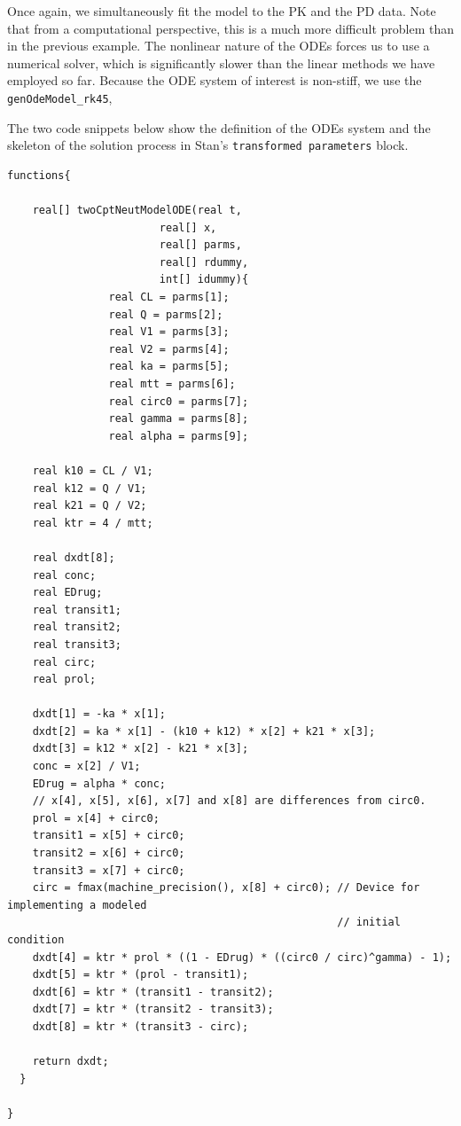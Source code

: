 \documentclass[10pt, reqno, oneside]{amsbook}
\numberwithin{equation}{chapter}
\numberwithin{figure}{chapter}
\numberwithin{table}{chapter}
\theoremstyle{remark}
\begin{document}
Once again, we simultaneously fit the model to the PK and the PD
data. Note that from a computational perspective, this is a much more
difficult problem than in the previous
example. The nonlinear nature of the ODEs forces us to use a numerical
solver, which is significantly slower than the linear methods we have
employed so far. Because the ODE system of interest is non-stiff, we
use the \texttt{genOdeModel\_rk45}, 

The two code snippets below show the definition of the ODEs
system and the skeleton of the solution process in Stan's
\texttt{transformed parameters} block.
\begin{verbatim}
functions{

    real[] twoCptNeutModelODE(real t,
                        real[] x,
                        real[] parms,
                        real[] rdummy,
                        int[] idummy){
                real CL = parms[1];
                real Q = parms[2];
                real V1 = parms[3];
                real V2 = parms[4];
                real ka = parms[5];
                real mtt = parms[6];
                real circ0 = parms[7];
                real gamma = parms[8];
                real alpha = parms[9];

    real k10 = CL / V1;
    real k12 = Q / V1;
    real k21 = Q / V2;
    real ktr = 4 / mtt;

    real dxdt[8];
    real conc;
    real EDrug;
    real transit1;
    real transit2;
    real transit3;
    real circ;
    real prol;

    dxdt[1] = -ka * x[1];
    dxdt[2] = ka * x[1] - (k10 + k12) * x[2] + k21 * x[3];
    dxdt[3] = k12 * x[2] - k21 * x[3];
    conc = x[2] / V1;
    EDrug = alpha * conc;
    // x[4], x[5], x[6], x[7] and x[8] are differences from circ0.
    prol = x[4] + circ0;
    transit1 = x[5] + circ0;
    transit2 = x[6] + circ0;
    transit3 = x[7] + circ0;
    circ = fmax(machine_precision(), x[8] + circ0); // Device for implementing a modeled 
                                                    // initial condition
    dxdt[4] = ktr * prol * ((1 - EDrug) * ((circ0 / circ)^gamma) - 1);
    dxdt[5] = ktr * (prol - transit1);
    dxdt[6] = ktr * (transit1 - transit2);
    dxdt[7] = ktr * (transit2 - transit3);
    dxdt[8] = ktr * (transit3 - circ);

    return dxdt;
  }

}
\end{verbatim}
\end{document}
